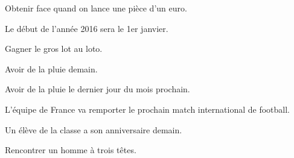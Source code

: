 \begin{enumerate}
\begin{minipage}{0.48\linewidth}
\item Obtenir face quand on lance une pièce d'un euro. 
\item Le début de l'année 2016 sera le 1er janvier.
\item Gagner le gros lot au loto.
\item Avoir de la pluie demain.
\end{minipage}
\hfill
\begin{minipage}{0.48\linewidth}
\item Avoir de la pluie le dernier jour du mois prochain.
\item L’équipe de France va remporter le prochain match international de football.
\item Un élève de la classe a son anniversaire demain.
\item Rencontrer un homme à trois têtes.
\end{minipage}
\end{enumerate}